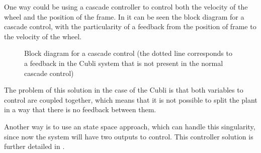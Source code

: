 One way could be using a cascade controller to control both the velocity of the wheel and the position of the frame. In  it can be seen the block diagram for a cascade control, with the particularity of a feedback from the position of frame to the velocity of the wheel.

\begin{figure}[H]
	
	\centering
	\caption{Block diagram for a cascade control (the dotted line corresponds to a feedback in the Cubli system that is not present in the normal cascade control)}
	\label{cascadeControl}
\end{figure}

The problem of this solution in the case of the Cubli is that both variables to control are coupled together, which means that it is not possible to split the plant in a way that there is no feedback between them.\cite{LRusso}

Another way is to use an state space approach, which can handle this singularity, since now the system will have two outputs to control. This controller solution is further detailed in .
